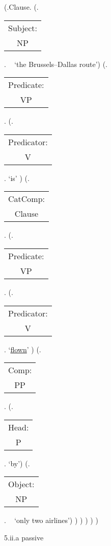 \documentclass[12pt,letterpaper]{article}
\begin{document}
\begin{figure}
	\begin{center}
		\begin{parsetree}
			(.Clause.
			(.\begin{tabular}{c}Subject:\\NP\end{tabular}. ~ `the Brussels--Dallas route')
			(.\begin{tabular}{c}Predicate:\\VP\end{tabular}.
			(.\begin{tabular}{c}Predicator:\\V\end{tabular}. `is' )
			(.\begin{tabular}{c}CatComp:\\Clause\end{tabular}. 
			(.\begin{tabular}{c}Predicate:\\VP\end{tabular}.
			(.\begin{tabular}{c}Predicator:\\V\end{tabular}. `\underline{flown}' )
			(.\begin{tabular}{c}Comp:\\PP\end{tabular}. 
			(.\begin{tabular}{c}Head:\\P\end{tabular}. `by')
			(.\begin{tabular}{c}Object:\\NP\end{tabular}. ~ `only two airlines')
			)
			)
			)
			)
			)
			
		\end{parsetree}
		\hfill \break \hfill \break
		5.ii.a passive
	\end{center}
\end{figure}
\end{document}
